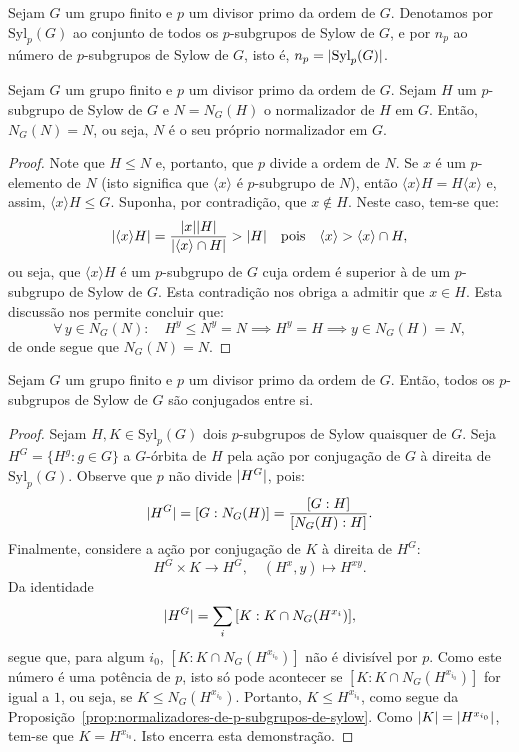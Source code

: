 \begin{definition}
  Sejam $G$ um grupo finito e $p$ um divisor primo da ordem de $G$. Denotamos por $\text{Syl}_{p}(G)$ ao conjunto de todos os $p$-subgrupos de Sylow de $G$, e por $n_{p}$ ao número de $p$-subgrupos de Sylow de $G$, isto é, $n_{p}=\lvert\text{Syl}_{p}(G)\rvert$.
\end{definition}

\begin{proposition}\label{prop:normalizadores-de-p-subgrupos-de-sylow}
  Sejam $G$ um grupo finito e $p$ um divisor primo da ordem de $G$. Sejam $H$ um $p$-subgrupo de Sylow de $G$ e $N=N_{G}(H)$ o normalizador de $H$ em $G$. Então, $N_{G}(N)=N$, ou seja, $N$ é o seu próprio normalizador em $G$.
\end{proposition}

\begin{proof}
  Note que $H\leqslant{N}$ e, portanto, que $p$ divide a ordem de $N$. Se $x$ é um $p$-elemento de $N$ (isto significa que $\langle{x}\rangle$ é $p$-subgrupo de $N$), então $\langle{x}\rangle{H}=H\langle{x}\rangle$ e, assim, $\langle{x}\rangle{H}\leqslant{G}$. Suponha, por contradição, que $x\notin{H}$. Neste caso, tem-se que:
  \[
    \lvert\langle{x}\rangle{H}\rvert=\frac{\lvert x\rvert\lvert H\rvert}{\lvert\langle{x}\rangle\cap{H}\rvert}>\lvert H\rvert\quad\text{pois}\quad\langle{x}\rangle>\langle{x}\rangle\cap{H},
  \]
  ou seja, que $\langle{x}\rangle{H}$ é um $p$-subgrupo de $G$ cuja ordem é superior à de um $p$-subgrupo de Sylow de $G$. Esta contradição nos obriga a admitir que $x\in{H}$. Esta discussão nos permite concluir que:
  \[
    \forall\,y\in{N_{G}(N)}:\quad{H^{y}\leqslant{N^{y}=N}\implies{H^{y}=H}\implies{y\in{N_{G}(H)=N}}},
  \]
  de onde segue que $N_{G}(N)=N$.
\end{proof}

\begin{theorem}[Sylow]\label{thm:segundo-teorema-de-sylow}
  Sejam $G$ um grupo finito e $p$ um divisor primo da ordem de $G$. Então, todos os $p$-subgrupos de Sylow de $G$ são conjugados entre si.
\end{theorem}

\begin{proof}
  Sejam $H,K\in\text{Syl}_{p}(G)$ dois $p$-subgrupos de Sylow quaisquer de $G$. Seja $H^{G}=\{H^{g}:g\in{G}\}$ a $G$-órbita de $H$ pela ação por conjugação de $G$ à direita de $\text{Syl}_{p}(G)$. Observe que $p$ não divide $\lvert H^{G}\rvert$, pois:
  \[
    \lvert H^{G}\rvert=[G:N_{G}(H)]=\frac{[G:H]}{[N_{G}(H):H]}.
  \]
  Finalmente, considere a ação por conjugação de $K$ à direita de $H^{G}$:
  \[
    H^{G}\times{K}\to{H^{G}},\quad{(H^{x},y)\mapsto{H^{xy}}}.
  \]
  Da identidade
  \[
    \lvert H^{G}\rvert=\sum_{i}\,[K:K\cap{N_{G}(H^{x_{i}})}],
  \]
  segue que, para algum $i_{0}$, $[K:K\cap{N_{G}(H^{x_{i_{0}}})}]$ não é divisível por $p$. Como este número é uma potência de $p$, isto só pode acontecer se $[K:K\cap{N_{G}(H^{x_{i_{0}}})}]$ for igual a $1$, ou seja, se $K\leqslant{N_{G}(H^{x_{i_{0}}})}$. Portanto, $K\leqslant{H^{x_{i_{0}}}}$, como segue da Proposição~\ref{prop:normalizadores-de-p-subgrupos-de-sylow}. Como $\lvert K\rvert=\lvert H^{x_{i_{0}}}\rvert$, tem-se que $K=H^{x_{i_{0}}}$. Isto encerra esta demonstração.
\end{proof}

